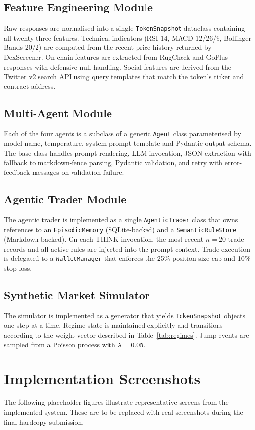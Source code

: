 \documentclass[12pt,a4paper,oneside,openany]{book}
\begin{document}
\begin{itemize}[leftmargin=8mm]
\subsection{Feature Engineering Module}
Raw responses are normalised into a single \texttt{TokenSnapshot} dataclass containing all twenty-three features. Technical indicators (RSI-14, MACD-12/26/9, Bollinger Bands-20/2) are computed from the recent price history returned by DexScreener. On-chain features are extracted from RugCheck and GoPlus responses with defensive null-handling. Social features are derived from the Twitter v2 search API using query templates that match the token's ticker and contract address.

\subsection{Multi-Agent Module}
Each of the four agents is a subclass of a generic \texttt{Agent} class parameterised by model name, temperature, system prompt template and Pydantic output schema. The base class handles prompt rendering, LLM invocation, JSON extraction with fallback to markdown-fence parsing, Pydantic validation, and retry with error-feedback messages on validation failure.

\subsection{Agentic Trader Module}
The agentic trader is implemented as a single \texttt{AgenticTrader} class that owns references to an \texttt{EpisodicMemory} (SQLite-backed) and a \texttt{SemanticRuleStore} (Markdown-backed). On each THINK invocation, the most recent $n = 20$ trade records and all active rules are injected into the prompt context. Trade execution is delegated to a \texttt{WalletManager} that enforces the 25\% position-size cap and 10\% stop-loss.

\subsection{Synthetic Market Simulator}
The simulator is implemented as a generator that yields \texttt{TokenSnapshot} objects one step at a time. Regime state is maintained explicitly and transitions according to the weight vector described in Table~\ref{tab:regimes}. Jump events are sampled from a Poisson process with $\lambda = 0.05$.

\section{Implementation Screenshots}
The following placeholder figures illustrate representative screens from the implemented system. These are to be replaced with real screenshots during the final hardcopy submission.


\end{itemize}
\end{document}
